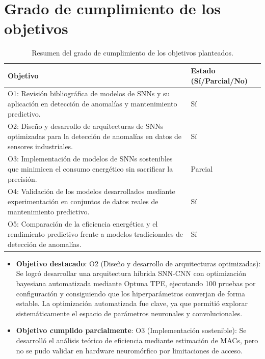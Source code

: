\section{Grado de cumplimiento de los objetivos}
\begin{table}[htbp]
    \centering
    \small
    \begin{tabular}{p{}p{}}
        \hline\hline
        \textbf{Objetivo} & \textbf{Estado (Sí/Parcial/No)} \\
        \hline
        O1: Revisión bibliográfica de modelos de SNNs y su aplicación en detección de anomalías y mantenimiento predictivo. & Sí \\
        O2: Diseño y desarrollo de arquitecturas de SNNs optimizadas para la detección de anomalías en datos de sensores industriales. & Sí \\
        O3: Implementación de modelos de SNNs sostenibles que minimicen el consumo energético sin sacrificar la precisión. & Parcial \\
        O4: Validación de los modelos desarrollados mediante experimentación en conjuntos de datos reales de mantenimiento predictivo. & Sí \\
        O5: Comparación de la eficiencia energética y el rendimiento predictivo frente a modelos tradicionales de detección de anomalías. & Sí \\ 
        \hline\hline
    \end{tabular}
    \caption{Resumen del grado de cumplimiento de los objetivos planteados.}
    \label{tab:objetivos-cumplimiento}
\end{table}


\begin{itemize}
    \item \textbf{Objetivo destacado}: O2 (Diseño y desarrollo de arquitecturas optimizadas): Se logró desarrollar una arquitectura híbrida SNN-CNN con optimización bayesiana automatizada mediante Optuna TPE, ejecutando 100 pruebas por configuración y consiguiendo que los hiperparámetros converjan de forma estable. La optimización automatizada fue clave, ya que permitió explorar sistemáticamente el espacio de parámetros neuronales y convolucionales.
    \item \textbf{Objetivo cumplido parcialmente}: O3 (Implementación sostenible): Se desarrolló el análisis teórico de eficiencia mediante estimación de MACs, pero no se pudo validar en hardware neuromórfico por limitaciones de acceso.
\end{itemize}

